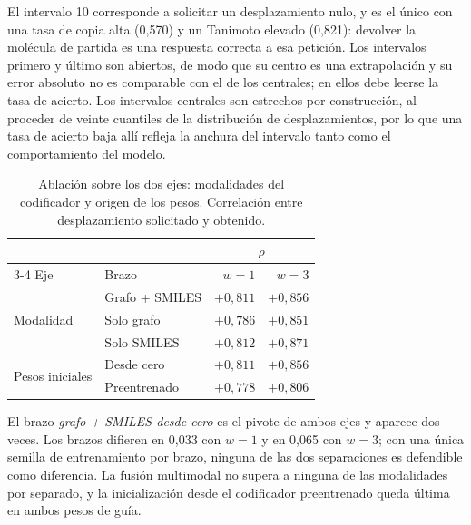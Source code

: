 \begin{table}[htbp]
  \vspace{0.5em}
  \begin{minipage}{0.92\textwidth}
    \footnotesize
    El intervalo 10 corresponde a solicitar un desplazamiento nulo, y es el único con
    una tasa de copia alta (0,570) y un Tanimoto elevado (0,821): devolver la molécula
    de partida es una respuesta correcta a esa petición. Los intervalos primero y último
    son abiertos, de modo que su centro es una extrapolación y su error absoluto no es
    comparable con el de los centrales; en ellos debe leerse la tasa de acierto. Los
    intervalos centrales son estrechos por construcción, al proceder de veinte cuantiles
    de la distribución de desplazamientos, por lo que una tasa de acierto baja allí
    refleja la anchura del intervalo tanto como el comportamiento del modelo.
  \end{minipage}
\end{table}


\begin{table}[htbp]
  \centering
  \caption{Ablación sobre los dos ejes: modalidades del codificador y origen
           de los pesos. Correlación entre desplazamiento solicitado y obtenido.}
  \label{tab:c3-ablacion}
  \small
  \begin{tabular}{@{}llrr@{}}
    \toprule
    & & \multicolumn{2}{c}{$\rho$} \\
    \cmidrule(lr){3-4}
    Eje & Brazo & $w = 1$ & $w = 3$ \\
    \midrule
    \multirow{3}{*}{Modalidad}
      & Grafo + SMILES & $+0{,}811$ & $+0{,}856$ \\
      & Solo grafo     & $+0{,}786$ & $+0{,}851$ \\
      & Solo SMILES    & $+0{,}812$ & $+0{,}871$ \\
    \midrule
    \multirow{2}{*}{Pesos iniciales}
      & Desde cero     & $+0{,}811$ & $+0{,}856$ \\
      & Preentrenado   & $+0{,}778$ & $+0{,}806$ \\
    \bottomrule
  \end{tabular}

  \vspace{0.5em}
  \begin{minipage}{0.92\textwidth}
    \footnotesize
    El brazo \emph{grafo + SMILES desde cero} es el pivote de ambos ejes y aparece dos
    veces. Los brazos difieren en 0,033 con $w = 1$ y en 0,065 con $w = 3$; con una
    única semilla de entrenamiento por brazo, ninguna de las dos separaciones es
    defendible como diferencia. La fusión multimodal no supera a ninguna de las
    modalidades por separado, y la inicialización desde el codificador preentrenado
    queda última en ambos pesos de guía.
  \end{minipage}
\end{table}


